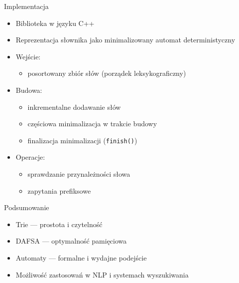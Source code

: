 \documentclass{beamer}
\begin{document}

\begin{frame}{Implementacja}
    \begin{itemize}
        \item Biblioteka w języku C++
        \item Reprezentacja słownika jako minimalizowany automat deterministyczny
        \item Wejście:
              \begin{itemize}
                  \item posortowany zbiór słów (porządek leksykograficzny)
              \end{itemize}
        \item Budowa:
              \begin{itemize}
                  \item inkrementalne dodawanie słów
                  \item częściowa minimalizacja w trakcie budowy
                  \item finalizacja minimalizacji (\texttt{finish()})
              \end{itemize}
        \item Operacje:
              \begin{itemize}
                  \item sprawdzanie przynależności słowa
                  \item zapytania prefiksowe
              \end{itemize}
    \end{itemize}
\end{frame}


\begin{frame}{Podsumowanie}
    \begin{itemize}
        \item Trie — prostota i czytelność
        \item DAFSA — optymalność pamięciowa
        \item Automaty — formalne i wydajne podejście
        \item Możliwość zastosowań w NLP i systemach wyszukiwania
    \end{itemize}
\end{frame}

\end{document}
